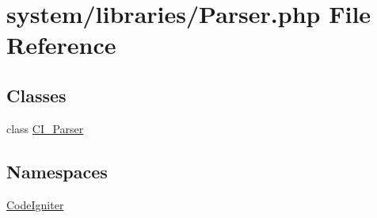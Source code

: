 \hypertarget{_parser_8php}{}\section{system/libraries/\+Parser.php File Reference}
\label{_parser_8php}
\subsection*{Classes}
\begin{DoxyCompactItemize}
\item 
class \mbox{\hyperlink{class_c_i___parser}{C\+I\+\_\+\+Parser}}
\end{DoxyCompactItemize}
\subsection*{Namespaces}
\begin{DoxyCompactItemize}
\item 
 \mbox{\hyperlink{namespace_code_igniter}{Code\+Igniter}}
\end{DoxyCompactItemize}
